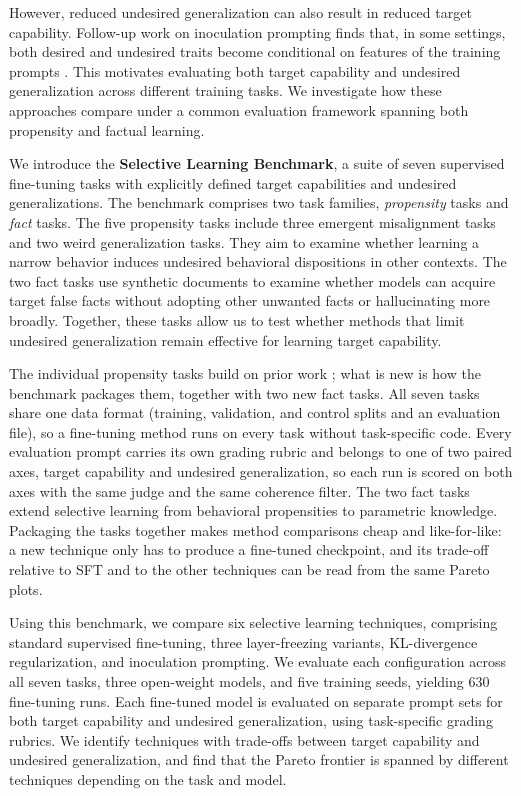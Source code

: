 \documentclass[11pt]{article}
\begin{document}
However, reduced undesired generalization can also result in reduced target capability.
Follow-up work on inoculation prompting finds that, in some settings, both desired and undesired
traits become conditional on features of the training prompts \citep{riche2026conditionalization}.
This motivates evaluating both target capability and undesired generalization across different
training tasks. We investigate how these approaches compare under a common evaluation framework
spanning both propensity and factual learning.

We introduce the \textbf{Selective Learning Benchmark}, a suite of seven supervised fine-tuning
tasks with explicitly defined target capabilities and undesired generalizations. The benchmark
comprises two task families, \emph{propensity} tasks and \emph{fact} tasks. The five propensity
tasks include three emergent misalignment tasks and two weird generalization tasks. They aim to
examine whether learning a narrow behavior induces undesired behavioral dispositions in other
contexts. The two fact tasks use synthetic documents to examine whether models can acquire target
false facts without adopting other unwanted facts or hallucinating more broadly. Together, these
tasks allow us to test whether methods that limit undesired generalization remain effective for
learning target capability.

The individual propensity tasks build on prior work
\citep{turner2025modelorganisms,taylor2025schoolofrewardhacks,betley2025weird}; what is new is how
the benchmark packages them, together with two new fact tasks. All seven tasks share one data
format (training, validation, and control splits and an evaluation file), so a fine-tuning method
runs on every task without task-specific code. Every evaluation prompt carries its own grading
rubric and belongs to one of two paired axes, target capability and undesired generalization, so
each run is scored on both axes with the same judge and the same coherence filter. The two fact
tasks extend selective learning from behavioral propensities to parametric knowledge. Packaging
the tasks together makes method comparisons cheap and like-for-like: a new technique only has to
produce a fine-tuned checkpoint, and its trade-off relative to SFT and to the other techniques can
be read from the same Pareto plots.

Using this benchmark, we compare six selective learning techniques, comprising standard
supervised fine-tuning, three layer-freezing variants, KL-divergence regularization, and
inoculation prompting. We evaluate each configuration across all seven tasks, three open-weight
models, and five training seeds, yielding 630 fine-tuning runs. Each fine-tuned model is
evaluated on separate prompt sets for both target capability and undesired generalization, using
task-specific grading rubrics. We identify techniques with trade-offs between target capability
and undesired generalization, and find that the Pareto frontier is spanned by different
techniques depending on the task and model.
\end{document}
